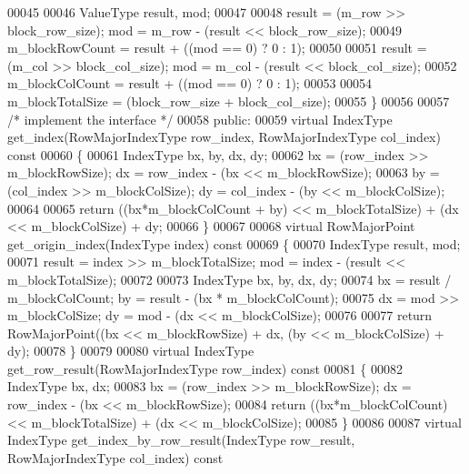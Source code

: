 \begin{DoxyCode}
00045 
00046                 ValueType result, mod;
00047 
00048                 result = (m\_row >> block\_row\_size); mod = m\_row - (result << 
      block\_row\_size);
00049                 m\_blockRowCount = result + ((mod == 0) ? 0 : 1);
00050 
00051                 result = (m\_col >> block\_col\_size); mod = m\_col - (result << 
      block\_col\_size);
00052                 m\_blockColCount = result + ((mod == 0) ? 0 : 1);
00053 
00054                 m\_blockTotalSize = (block\_row\_size + block\_col\_size);
00055         \}
00056 
00057 \textcolor{comment}{/* implement the interface */}
00058 \textcolor{keyword}{public}:
00059         \textcolor{keyword}{virtual} IndexType get_index(RowMajorIndexType row\_index, 
      RowMajorIndexType col\_index)\textcolor{keyword}{ const}
00060 \textcolor{keyword}{        }\{
00061                 IndexType bx, by, dx, dy;
00062                 bx = (row\_index >> m\_blockRowSize); dx = row\_index - (bx << 
      m\_blockRowSize);
00063                 by = (col\_index >> m\_blockColSize); dy = col\_index - (by << 
      m\_blockColSize);
00064 
00065                 \textcolor{keywordflow}{return} ((bx*m\_blockColCount + by) << m\_blockTotalSize) + (dx <<
       m\_blockColSize) + dy;
00066         \}
00067 
00068         \textcolor{keyword}{virtual} RowMajorPoint get_origin_index(IndexType index)\textcolor{keyword}{ const}
00069 \textcolor{keyword}{        }\{
00070                 IndexType result, mod;
00071                 result = index >> m\_blockTotalSize; mod = index - (result << 
      m\_blockTotalSize);
00072 
00073                 IndexType bx, by, dx, dy;
00074                 bx = result / m\_blockColCount; by = result - (bx * 
      m\_blockColCount);
00075                 dx = mod >> m\_blockColSize; dy = mod - (dx << m\_blockColSize);
00076 
00077                 \textcolor{keywordflow}{return} RowMajorPoint((bx << m\_blockRowSize) + dx, (by << 
      m\_blockColSize) + dy);
00078         \}
00079 
00080         \textcolor{keyword}{virtual} IndexType get_row_result(RowMajorIndexType row\_index)\textcolor{keyword}{ const}
00081 \textcolor{keyword}{        }\{
00082                 IndexType bx, dx;
00083                 bx = (row\_index >> m\_blockRowSize); dx = row\_index - (bx << 
      m\_blockRowSize);
00084                 \textcolor{keywordflow}{return} ((bx*m\_blockColCount) << m\_blockTotalSize) + (dx << 
      m\_blockColSize);
00085         \}
00086 
00087         \textcolor{keyword}{virtual} IndexType get_index_by_row_result(IndexType row\_result, 
      RowMajorIndexType col\_index)\textcolor{keyword}{ const}

\end{DoxyCode}
